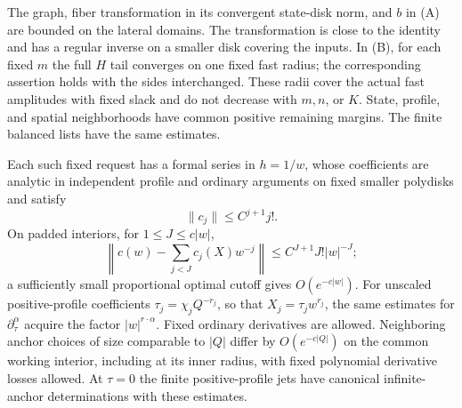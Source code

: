 \begin{lemma}\label{lem:additive-slow}
The graph, fiber transformation in its convergent state-disk norm, and
$b$ in (A) are bounded on the lateral domains.  The transformation is
close to the identity and has a regular inverse on a smaller disk
covering the inputs.  In (B), for each fixed $m$ the full $H$ tail
converges on one fixed fast radius; the corresponding assertion holds
with the sides interchanged.  These radii cover the actual fast
amplitudes with fixed slack and do not decrease with $m,n$, or $K$.
State, profile, and spatial neighborhoods have common positive remaining
margins.  The finite balanced lists have the same estimates.

Each such fixed request has a formal series in $h=1/w$, whose coefficients
are analytic in independent profile and ordinary arguments on fixed
smaller polydisks and satisfy
\begin{equation}\label{eq:additive-Gevrey}
 \|c_j\|\le C^{j+1}j!.
\end{equation}
On padded interiors, for $1\le J\le c|w|$,
\begin{equation}\label{eq:additive-Gevrey-error}
 \left\|c(w)-\sum_{j<J}c_j(X)w^{-j}\right\|
       \le C^{J+1}J!|w|^{-J};
\end{equation}
a sufficiently small proportional optimal cutoff gives $O(e^{-c|w|})$.
For unscaled positive-profile coefficients
$\tau_j=\chi_jQ^{-r_j}$, so that $X_j=\tau_jw^{r_j}$,
the same estimates for $\partial_\tau^\alpha$ acquire the factor
$|w|^{r\cdot\alpha}$.  Fixed ordinary derivatives are allowed.
Neighboring anchor choices of size comparable to $|Q|$ differ by
$O(e^{-c|Q|})$ on the common working interior, including at its inner
radius, with fixed polynomial derivative losses allowed.
At $\tau=0$ the finite positive-profile jets have canonical
infinite-anchor determinations with these estimates.
\end{lemma}

